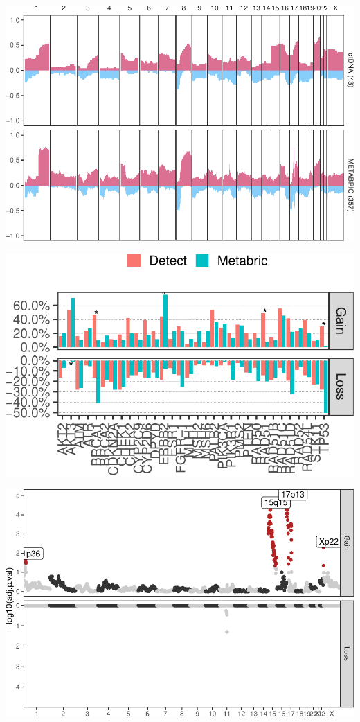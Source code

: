 \documentclass[]{article}
\begin{document}
\begin{center}\includegraphics{detect.her2.manuscript_files/figure-latex/metabric.overview.plot-1} \end{center}

\begin{center}\includegraphics{detect.her2.manuscript_files/figure-latex/metabric.drivers.plot-1} \end{center}

\begin{center}\includegraphics{detect.her2.manuscript_files/figure-latex/metabric.gwas.plot-1} \end{center}
\end{document}
